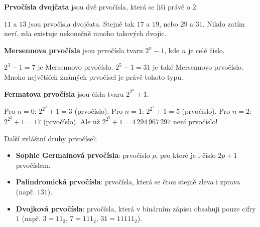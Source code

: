 \documentclass[12pt,a4paper]{article}
\begin{document}
\begin{definitionbox}
\textbf{Prvočísla dvojčata} jsou dvě prvočísla, která se liší právě o $2$.
\end{definitionbox}

\begin{examplebox}
$11$ a $13$ jsou prvočísla dvojčata.  
Stejně tak $17$ a $19$, nebo $29$ a $31$.  
Nikdo zatím neví, zda existuje nekonečně mnoho takových dvojic.
\end{examplebox}

\begin{definitionbox}
\textbf{Mersennova prvočísla} jsou prvočísla tvaru $2^n - 1$, kde $n$ je celé číslo.
\end{definitionbox}

\begin{examplebox}
$2^3 - 1 = 7$ je Mersennovo prvočíslo.  
$2^5 - 1 = 31$ je také Mersennovo prvočíslo.  
Mnoho největších známých prvočísel je právě tohoto typu.
\end{examplebox}

\begin{definitionbox}
\textbf{Fermatova prvočísla} jsou čísla tvaru $2^{2^n} + 1$.
\end{definitionbox}

\begin{examplebox}
Pro $n=0$: $2^{2^0}+1 = 3$ (prvočíslo).  
Pro $n=1$: $2^{2^1}+1 = 5$ (prvočíslo).  
Pro $n=2$: $2^{2^2}+1 = 17$ (prvočíslo).  
Ale už $2^{2^5}+1 = 4\,294\,967\,297$ není prvočíslo!
\end{examplebox}

\begin{notebox}
Další zvláštní druhy prvočísel:  
\begin{itemize}
    \item \textbf{Sophie Germainová prvočísla}: prvočíslo $p$, pro které je i číslo $2p+1$ prvočíslem.  
    \item \textbf{Palindromická prvočísla}: prvočísla, která se čtou stejně zleva i zprava (např. $131$).  
    \item \textbf{Dvojková prvočísla}: prvočísla, která v binárním zápisu obsahují pouze cifry $1$ (např. $3=11_2$, $7=111_2$, $31=11111_2$).
\end{itemize}
\end{notebox}


\end{document}
